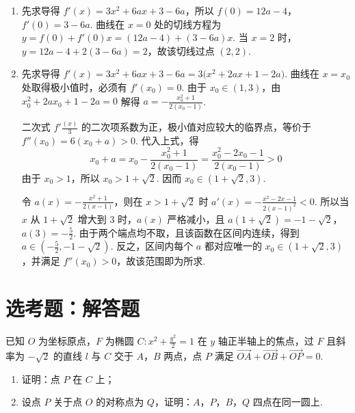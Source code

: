 \begin{solution}
\begin{enumerate}
\item 先求导得 \(f'(x)=3x^2+6ax+3-6a\)，所以 \(f(0)=12a-4\)，\(f'(0)=3-6a\). 曲线在 \(x=0\) 处的切线方程为 \(y=f(0)+f'(0)x=(12a-4)+(3-6a)x\). 当 \(x=2\) 时，\(y=12a-4+2(3-6a)=2\)，故该切线过点 \((2,2)\).
\item 先求导得 \(f'(x)=3x^2+6ax+3-6a=3\bigl(x^2+2ax+1-2a\bigr)\). 曲线在 \(x=x_0\) 处取得极小值时，必须有 \(f'(x_0)=0\). 由于 \(x_0\in(1,3)\)，由
\(x_0^2+2ax_0+1-2a=0\) 解得 \(a=-\frac{x_0^2+1}{2(x_0-1)}\).

二次式 \(f'\frac{(x)}{3}\) 的二次项系数为正，极小值对应较大的临界点，等价于 \(f''(x_0)=6(x_0+a)>0\). 代入上式，得
\[
x_0+a=x_0-\frac{x_0^2+1}{2(x_0-1)}=\frac{x_0^2-2x_0-1}{2(x_0-1)}>0
\]
由于 \(x_0>1\)，所以 \(x_0>1+\sqrt{2}\). 因而 \(x_0\in(1+\sqrt{2},3)\).

令 \(a(x)=-\frac{x^2+1}{2(x-1)}\)，则在 \(x>1+\sqrt{2}\) 时
   \(a'(x)=-\frac{x^2-2x-1}{2(x-1)^2}<0\). 所以当 \(x\) 从 \(1+\sqrt{2}\) 增大到 \(3\) 时，\(a(x)\) 严格减小，且 \(a(1+\sqrt{2})=-1-\sqrt{2}\)，\(a(3)=-\frac{5}{2}\). 由于两个端点均不取，且该函数在区间内连续，得到 \(a\in\left(-\frac{5}{2},-1-\sqrt{2}\right)\). 反之，区间内每个 \(a\) 都对应唯一的 \(x_0\in(1+\sqrt{2},3)\)，并满足 \(f''(x_0)>0\)，故该范围即为所求.
\end{enumerate}
\end{solution}

\section{选考题：解答题}

\begin{problem}
已知 \(O\) 为坐标原点，\(F\) 为椭圆 \(C:x^2+\frac{y^2}{2}=1\) 在 \(y\) 轴正半轴上的焦点，过 \(F\) 且斜率为 \(-\sqrt{2}\) 的直线 \(l\) 与 \(C\) 交于 \(A\)，\(B\) 两点，点 \(P\) 满足 \(\overrightarrow{OA}+\overrightarrow{OB}+\overrightarrow{OP}=0\).

\begin{enumerate}
\item 证明：点 \(P\) 在 \(C\) 上；
\item 设点 \(P\) 关于点 \(O\) 的对称点为 \(Q\)，证明：\(A\)，\(P\)，\(B\)，\(Q\) 四点在同一圆上.
\end{enumerate}

\end{problem}


